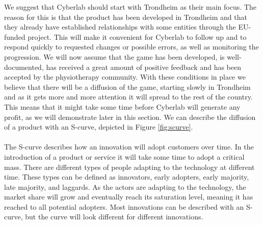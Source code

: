 We suggest that Cyberlab should start with Trondheim as their main focus. The reason for this is that the product has been developed in Trondheim and that they already have established relationships with some entities through the EU-funded project. This will make it convenient for Cyberlab to follow up and to respond quickly to requested changes or possible errors, as well as monitoring the progression. We will now assume that the game has been developed, is well-documented, has received a great amount of positive feedback and has been accepted by the physiotherapy community. With these conditions in place we believe that there will be a diffusion of the game, starting slowly in Trondheim and as it gets more and more attention it will spread to the rest of the country. This means that it might take some time before Cyberlab will generate any profit, as we will demonstrate later in this section. We can describe the diffusion of a product with an S-curve, depicted in Figure \ref{fig:scurve}. \\ \\
The S-curve describes how an innovation will adopt customers over time. In the introduction of a product or service it will take some time to adopt a critical mass. There are different types of people adapting to the technology at different time. These types can be defined as innovators, early adopters, early majority, late majority, and laggards. As the actors are adapting to the technology, the market share will grow and eventually reach its saturation level, meaning it has reached to all potential adopters. Most innovations can be described with an S-curve, but the curve will look different for different innovations\cite{scurve}.\\ \\
